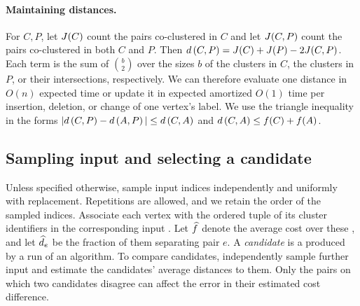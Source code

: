 \paragraph{Maintaining \clustering distances.}
For \clusterings $C,P$, let $ J(C)$ count the pairs co-clustered in $C$
and let $ J(C,P)$ count the pairs co-clustered in both $C$ and $P$. Then
$d\left(C,P\right)=J(C)+J(P)-2J(C,P)$. Each term is the sum of $\binom b2$
over the sizes $b$ of the clusters in $C$, the clusters in $P$, or
their intersections, respectively. We can therefore evaluate one
distance in $O(n)$ expected time or update it in expected amortized
$O(1)$ time per insertion, deletion, or change of one vertex's label.
We use the triangle inequality in the forms
$|d\left(C,P\right)-d\left(A,P\right)|\le d\left(C,A\right)$ and $d\left(C,A\right)\le f(C)+f(A)$.


\subsection{Sampling input \clusterings and selecting a candidate}
\label{sec:ensemble-transfer}

Unless specified otherwise, sample input indices independently and
uniformly with replacement. Repetitions are allowed, and we retain the
order of the sampled indices. Associate each vertex with the ordered tuple of its cluster identifiers
in the corresponding input \clusterings. Let
$\widehat {f}$ denote the average cost over these \clusterings, and let
$\estweight{e}$ be the fraction of them separating pair $e$. A
\emph{candidate} is a \clustering produced by a run of an algorithm.
To compare candidates, independently sample further input \clusterings
and estimate the candidates' average distances to them. Only the pairs
on which two candidates disagree can affect the error in their
estimated cost difference.

